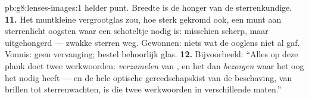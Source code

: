 \begin{solution}{pb:g8:lenses-images:1}
helder punt. Breedte is de honger van de sterrenkundige.
\textbf{11.} Het muntkleine vergrootglas zou, hoe sterk gekromd ook,
een munt aan sterrenlicht oogsten waar een schoteltje nodig is:
 misschien scherp, maar uitgehongerd --- zwakke
sterren weg. Gewonnen: niets wat de ooglens niet
al gaf. Vonnis: geen vervanging; bestel behoorlijk glas.
\textbf{12.} Bijvoorbeeld: ``Alles op deze plank doet twee werkwoorden:
\emph{verzamelen} van , en het dan \emph{bezorgen} waar het
oog het nodig heeft --- en de hele optische gereedschapskist van de
beschaving, van brillen tot sterrenwachten, is die twee werkwoorden in
verschillende maten.''
\end{solution}
